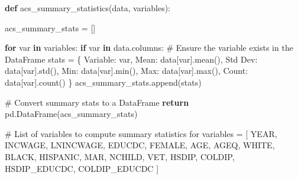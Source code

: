 \documentclass[
  11pt,
  letterpaper,
  DIV=11,
  numbers=noendperiod]{scrartcl}
\newenvironment{Shaded}{\begin{snugshade}}{\end{snugshade}}
\newcommand{\BuiltInTok}[1]{\textcolor[rgb]{0.00,0.23,0.31}{#1}}
\newcommand{\CommentTok}[1]{\textcolor[rgb]{0.37,0.37,0.37}{#1}}
\newcommand{\ControlFlowTok}[1]{\textcolor[rgb]{0.00,0.23,0.31}{\textbf{#1}}}
\newcommand{\KeywordTok}[1]{\textcolor[rgb]{0.00,0.23,0.31}{\textbf{#1}}}
\newcommand{\NormalTok}[1]{\textcolor[rgb]{0.00,0.23,0.31}{#1}}
\newcommand{\OperatorTok}[1]{\textcolor[rgb]{0.37,0.37,0.37}{#1}}
\newcommand{\StringTok}[1]{\textcolor[rgb]{0.13,0.47,0.30}{#1}}
\begin{document}
\begin{Shaded}
\begin{Highlighting}[]
\KeywordTok{def}\NormalTok{ acs\_summary\_statistics(data, variables):}

\NormalTok{    acs\_summary\_stats }\OperatorTok{=}\NormalTok{ []}

    \ControlFlowTok{for}\NormalTok{ var }\KeywordTok{in}\NormalTok{ variables:}
        \ControlFlowTok{if}\NormalTok{ var }\KeywordTok{in}\NormalTok{ data.columns:  }\CommentTok{\# Ensure the variable exists in the DataFrame}
\NormalTok{            stats }\OperatorTok{=}\NormalTok{ \{}
                \StringTok{\textquotesingle{}Variable\textquotesingle{}}\NormalTok{: var,}
                \StringTok{\textquotesingle{}Mean\textquotesingle{}}\NormalTok{: data[var].mean(),}
                \StringTok{\textquotesingle{}Std Dev\textquotesingle{}}\NormalTok{: data[var].std(),}
                \StringTok{\textquotesingle{}Min\textquotesingle{}}\NormalTok{: data[var].}\BuiltInTok{min}\NormalTok{(),}
                \StringTok{\textquotesingle{}Max\textquotesingle{}}\NormalTok{: data[var].}\BuiltInTok{max}\NormalTok{(),}
                \StringTok{\textquotesingle{}Count\textquotesingle{}}\NormalTok{: data[var].count()}
\NormalTok{            \}}
\NormalTok{            acs\_summary\_stats.append(stats)}

    \CommentTok{\# Convert summary stats to a DataFrame}
    \ControlFlowTok{return}\NormalTok{ pd.DataFrame(acs\_summary\_stats)}


\CommentTok{\# List of variables to compute summary statistics for}
\NormalTok{variables }\OperatorTok{=}\NormalTok{ [}
    \StringTok{\textquotesingle{}YEAR\textquotesingle{}}\NormalTok{, }\StringTok{\textquotesingle{}INCWAGE\textquotesingle{}}\NormalTok{, }\StringTok{\textquotesingle{}LNINCWAGE\textquotesingle{}}\NormalTok{, }\StringTok{\textquotesingle{}EDUCDC\textquotesingle{}}\NormalTok{, }\StringTok{\textquotesingle{}FEMALE\textquotesingle{}}\NormalTok{, }\StringTok{\textquotesingle{}AGE\textquotesingle{}}\NormalTok{, }\StringTok{\textquotesingle{}AGEQ\textquotesingle{}}\NormalTok{,}
    \StringTok{\textquotesingle{}WHITE\textquotesingle{}}\NormalTok{, }\StringTok{\textquotesingle{}BLACK\textquotesingle{}}\NormalTok{, }\StringTok{\textquotesingle{}HISPANIC\textquotesingle{}}\NormalTok{, }\StringTok{\textquotesingle{}MAR\textquotesingle{}}\NormalTok{, }\StringTok{\textquotesingle{}NCHILD\textquotesingle{}}\NormalTok{, }\StringTok{\textquotesingle{}VET\textquotesingle{}}\NormalTok{,}
    \StringTok{\textquotesingle{}HSDIP\textquotesingle{}}\NormalTok{, }\StringTok{\textquotesingle{}COLDIP\textquotesingle{}}\NormalTok{, }\StringTok{\textquotesingle{}HSDIP\_EDUCDC\textquotesingle{}}\NormalTok{, }\StringTok{\textquotesingle{}COLDIP\_EDUCDC\textquotesingle{}}
\NormalTok{]}


\end{Highlighting}
\end{Shaded}
\end{document}

